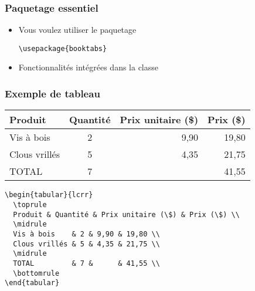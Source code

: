 \begin{frame}[fragile=singleslide]
  \frametitle{Paquetage essentiel}

  \begin{itemize}
  \item Vous voulez utiliser le paquetage 
\begin{lstlisting}
\usepackage{booktabs}
\end{lstlisting}
  \item Fonctionnalités intégrées dans la classe 
  \end{itemize}
\end{frame}

\begin{frame}[fragile=singleslide]
  \frametitle{Exemple de tableau}

  \begin{center}
    \begin{tabular}{lcrr}
      \toprule
      Produit & Quantité & Prix unitaire (\$) & Prix (\$) \\
      \midrule
      Vis à bois    & 2 & 9,90 & 19,80 \\
      Clous vrillés & 5 & 4,35 & 21,75 \\
      \midrule
      TOTAL         & 7 &      & 41,55 \\
      \bottomrule
    \end{tabular}
  \end{center}

\begin{lstlisting}
\begin{tabular}{lcrr}
  \toprule
  Produit & Quantité & Prix unitaire (\$) & Prix (\$) \\
  \midrule
  Vis à bois    & 2 & 9,90 & 19,80 \\
  Clous vrillés & 5 & 4,35 & 21,75 \\
  \midrule
  TOTAL         & 7 &      & 41,55 \\
  \bottomrule
\end{tabular}
\end{lstlisting}
\end{frame}

